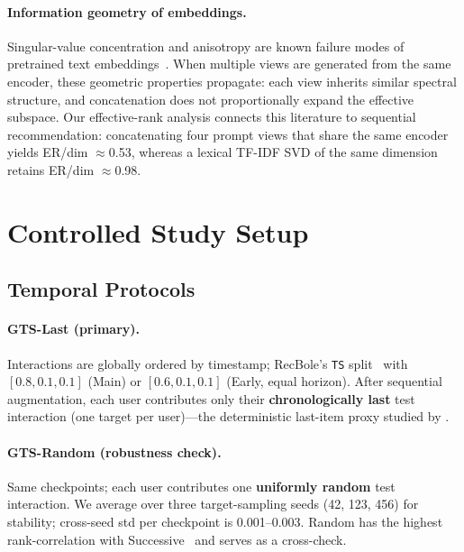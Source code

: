 \documentclass[sigconf,natbib=true,anonymous]{acmart}
\newcommand{\tfidf}{\textsc{TF-IDF}\xspace}
\begin{document}
\paragraph{Information geometry of embeddings.}
Singular-value concentration and anisotropy are known failure modes of pretrained text embeddings~\cite{ethayarajh2019contextual}.
When multiple views are generated from the same encoder, these geometric properties propagate: each view inherits similar spectral structure, and concatenation does not proportionally expand the effective subspace.
Our effective-rank analysis connects this literature to sequential recommendation: concatenating four prompt views that share the same encoder yields ER/dim $\approx$0.53, whereas a lexical \tfidf SVD of the same dimension retains ER/dim $\approx$0.98.

\section{Controlled Study Setup}
\label{sec:setup}

\subsection{Temporal Protocols}
\label{sec:protocol}

\paragraph{GTS-Last (primary).}
Interactions are globally ordered by timestamp; RecBole's \texttt{TS} split~\cite{zhao2021recbole} with $[0.8,0.1,0.1]$ (Main) or $[0.6,0.1,0.1]$ (Early, equal horizon).
After sequential augmentation, each user contributes only their \textbf{chronologically last} test interaction (one target per user)---the deterministic last-item proxy studied by \citet{gusak2025time}.

\paragraph{GTS-Random (robustness check).}
Same checkpoints; each user contributes one \textbf{uniformly random} test interaction.  We average over three target-sampling seeds (42, 123, 456) for stability; cross-seed std per checkpoint is 0.001--0.003.
Random has the highest rank-correlation with Successive~\cite{gusak2025time} and serves as a cross-check.
\end{document}
